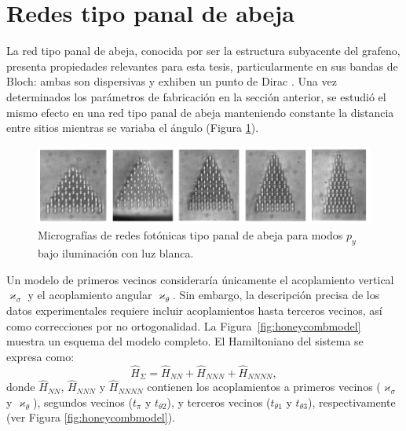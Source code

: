 \section{Redes tipo panal de abeja}
La red tipo panal de abeja, conocida por ser la estructura subyacente del grafeno, presenta propiedades relevantes para esta tesis, particularmente en sus bandas de Bloch: ambas son dispersivas y exhiben un punto de Dirac \citep{honeycombdirac}. Una vez determinados los parámetros de fabricación en la sección anterior, se estudió el mismo efecto en una red tipo panal de abeja manteniendo constante la distancia entre sitios mientras se variaba el ángulo (Figura \ref{fig:HCLBW}).
\begin{figure}[H]
	\centering
	\includegraphics[width=\linewidth]{media/honeycomb_lattices_bw.png}
	\caption[Micrografías de redes fotónicas tipo panal de abeja para modos P]{Micrografías de redes fotónicas tipo panal de abeja para modos $p_y$ bajo iluminación con luz blanca. \label{fig:HCLBW}}
\end{figure} \vspace{-3ex} Un modelo de primeros vecinos consideraría únicamente el acoplamiento vertical $\varkappa_\sigma$ y el acoplamiento angular $\varkappa_\theta$. Sin embargo, la descripción precisa de los datos experimentales requiere incluir acoplamientos hasta terceros vecinos, así como correcciones por no ortogonalidad. La Figura~\ref{fig:honeycombmodel} muestra un esquema del modelo completo. El Hamiltoniano del sistema se expresa como:
\begin{equation}
	\hat{H}_\Sigma = \hat{H}_{NN} + \hat{H}_{NNN} + \hat{H}_{NNNN},
\end{equation}
donde $\hat{H}_{NN}$, $\hat{H}_{NNN}$ y $\hat{H}_{NNNN}$ contienen los acoplamientos a primeros vecinos ($\varkappa_\sigma$ y $\varkappa_\theta$), segundos vecinos ($t_\pi$ y $t_{\theta 2}$), y terceros vecinos ($t_{\theta 1}$ y $t_{\theta 3}$), respectivamente (ver Figura \ref{fig:honeycombmodel}).

